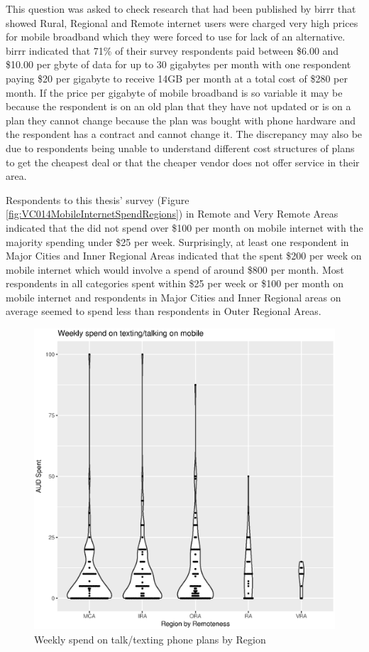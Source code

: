 This question was asked to check research that had been published by \acrshort{birrr} that showed Rural, Regional and Remote internet users were charged very high prices for mobile broadband which they were forced to use for lack of an alternative. \acrshort{birrr} indicated that 71\% of their survey respondents paid between \$6.00 and \$10.00 per \acrshort{gbyte} of data for up to 30 gigabytes per month with one respondent paying \$20 per gigabyte to receive 14GB per month at a total cost of \$280 per month\cite[p19]{RefWorks:212}.  If the price per gigabyte of mobile broadband is so variable it may be because the respondent is on an old plan that they have not updated or is on a plan they cannot change because the plan was bought with phone hardware and the respondent has a contract and cannot change it. The discrepancy may also be due to respondents being unable to understand different cost structures of plans to get the cheapest deal or that the cheaper vendor does not offer service in their area.

Respondents to this thesis' survey (Figure \ref{fig:VC014MobileInternetSpendRegions}) in Remote and Very Remote Areas indicated that the did not spend over \$100 per month on mobile internet with the majority spending under \$25 per week. Surprisingly, at least one respondent in Major Cities and Inner Regional Areas indicated that the spent \$200 per week on mobile internet which would involve a spend of around \$800 per month. Most respondents in all categories spent within \$25 per week or \$100 per month on mobile internet and respondents in Major Cities and Inner Regional areas on average seemed to spend less than respondents in Outer Regional Areas.


\begin{figure}
\centering
\includegraphics[scale=0.5]{figures/VChart15-WeeklySpendTalk.eps}
\caption{Weekly spend on talk/texting phone plans by Region} \label{fig:VC015WeeklySpendTalkRegions}
\end{figure}



